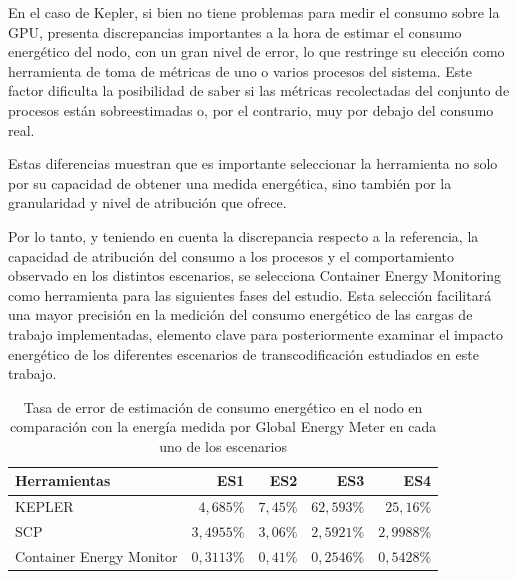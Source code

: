 En el caso de Kepler, si bien no tiene problemas para medir el consumo sobre la GPU, presenta discrepancias importantes a la hora de estimar el consumo energético del nodo, con un gran nivel de error, lo que restringe su elección como herramienta de toma de métricas de uno o varios procesos del sistema. Este factor dificulta la posibilidad de saber si las métricas recolectadas del conjunto de procesos están sobreestimadas o, por el contrario, muy por debajo del consumo real.

Estas diferencias muestran que es importante seleccionar la herramienta no solo por su capacidad de obtener una medida energética, sino también por la granularidad y nivel de atribución que ofrece.

Por lo tanto, y teniendo en cuenta la discrepancia respecto a la referencia, la capacidad de atribución del consumo a los procesos y el comportamiento observado en los distintos escenarios, se selecciona Container Energy Monitoring como herramienta para las siguientes fases del estudio. Esta selección facilitará una mayor precisión en la medición del consumo energético de las cargas de trabajo implementadas, elemento clave para posteriormente examinar el impacto energético de los diferentes escenarios de transcodificación estudiados en este trabajo.

\begin{table}[ht!]

     \centering

     \begin{tabularx}{\textwidth}{|>{\raggedright\arraybackslash}X|r|r|r|r|}

     \hline

     \rowcolor[HTML]{C0C0C0} 

     Herramientas & ES1 & ES2 & ES3 & ES4 \\ \hline

     \cellcolor[HTML]{EFEFEF}KEPLER & $4,685\%$ & $7,45\%$ & $62,593\%$ & $25,16\%$ \\ \hline

     \cellcolor[HTML]{EFEFEF}SCP & $3,4955\%$ & $3,06\%$ & $2,5921\%$ & $2,9988\%$ \\ \hline

     \cellcolor[HTML]{EFEFEF}Container Energy Monitor & $0,3113\%$ & $0,41\%$ & $0,2546\%$ & $0,5428\%$ \\ \hline

     \end{tabularx}

     \caption{Tasa de error de estimación de consumo energético en el nodo en comparación con la energía medida por Global Energy Meter en cada uno de los escenarios}

     \label{tab:exp1-conclusiones-error}

\end{table}

